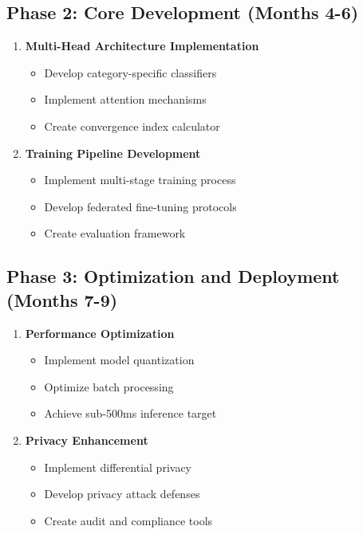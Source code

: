 \documentclass[11pt,a4paper]{article}
\begin{document}
\subsection{Phase 2: Core Development (Months 4-6)}

\begin{enumerate}
\item \textbf{Multi-Head Architecture Implementation}
   \begin{itemize}
   \item Develop category-specific classifiers
   \item Implement attention mechanisms
   \item Create convergence index calculator
   \end{itemize}

\item \textbf{Training Pipeline Development}
   \begin{itemize}
   \item Implement multi-stage training process
   \item Develop federated fine-tuning protocols
   \item Create evaluation framework
   \end{itemize}
\end{enumerate}

\subsection{Phase 3: Optimization and Deployment (Months 7-9)}

\begin{enumerate}
\item \textbf{Performance Optimization}
   \begin{itemize}
   \item Implement model quantization
   \item Optimize batch processing
   \item Achieve sub-500ms inference target
   \end{itemize}

\item \textbf{Privacy Enhancement}
   \begin{itemize}
   \item Implement differential privacy
   \item Develop privacy attack defenses
   \item Create audit and compliance tools
   \end{itemize}
\end{enumerate}
\end{document}

